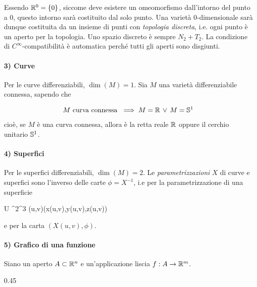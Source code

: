 Essendo $ \R^{0} = \{0\} $, siccome deve esistere un omeomorfismo dall'intorno del punto a $ 0 $, questo intorno sarà costituito dal solo punto. Una varietà 0-dimensionale sarà dunque costituita da un insieme di punti con \textit{topologia discreta}, i.e. ogni punto è un aperto per la topologia. Uno spazio discreto è sempre $ N_{2}+T_{2} $. La condizione di $ C^{\infty} $-compatibilità è automatica perché tutti gli aperti sono disgiunti.

\paragraph{3) Curve}

Per le curve differenziabili, $ \dim (M) = 1 $. Sia $ M $ una varietà differenziabile connessa, sapendo che

\begin{theorem}
	\begin{equation}
		M \text{ curva connessa } \implies M = \R \, \lor \, M = \S^{1}
	\end{equation}

	cioè, se $ M $ è una curva connessa, allora è la retta reale $ \R $ oppure il cerchio unitario $ \S^{1} $.
\end{theorem}

\paragraph{4) Superfici}

Per le superfici differenziabili, $ \dim (M) = 2 $. Le \textit{parametrizzazioni} $ X $ di curve e superfici sono l'inverso delle carte $ \phi = X^{-1} $, i.e per la parametrizzazione di una superficie

%
	{U \subset \R^{2}}{\R^{3}}%
	{(u,v)}{(x(u,v),y(u,v),z(u,v))}

e per la carta $ (X(u,v),\phi) $.

\paragraph{5) Grafico di una funzione}

Siano un aperto $ A \subset \R^{n} $ e un'applicazione liscia $ f : A \to \R^{m} $.

	{0.45}{%
		}


